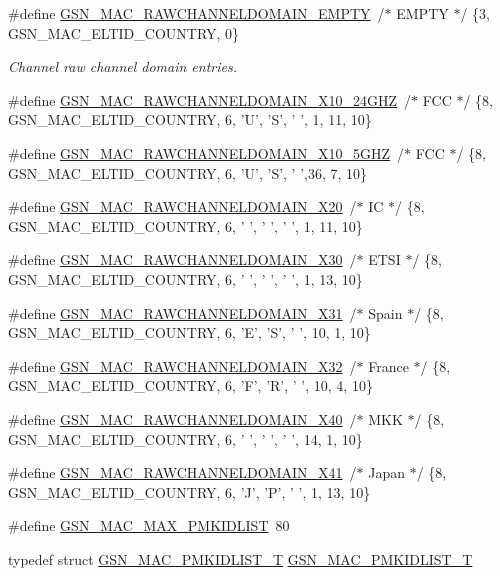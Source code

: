 \begin{DoxyCompactItemize}
\item 
\#define \hyperlink{a00642_ga56ae91b81107b9438ab55637317cab2c}{GSN\_\-MAC\_\-RAWCHANNELDOMAIN\_\-EMPTY}~/$\ast$ EMPTY  $\ast$/ \{3, GSN\_\-MAC\_\-ELTID\_\-COUNTRY, 0\}
\begin{DoxyCompactList}\small\item\em Channel raw channel domain entries. \end{DoxyCompactList}\item 
\#define \hyperlink{a00642_ga500c98f87ed8a4f3682e4b1b660bfe3d}{GSN\_\-MAC\_\-RAWCHANNELDOMAIN\_\-X10\_\-24GHZ}~/$\ast$ FCC    $\ast$/ \{8, GSN\_\-MAC\_\-ELTID\_\-COUNTRY, 6, 'U', 'S', ' ', 1, 11, 10\}
\item 
\#define \hyperlink{a00642_ga942c8bca51fccd885216a358eb762f55}{GSN\_\-MAC\_\-RAWCHANNELDOMAIN\_\-X10\_\-5GHZ}~/$\ast$ FCC    $\ast$/  \{8, GSN\_\-MAC\_\-ELTID\_\-COUNTRY, 6, 'U', 'S', ' ',36,  7, 10\}
\item 
\#define \hyperlink{a00642_gacbfcc1079a6c770488a643ba72c66f78}{GSN\_\-MAC\_\-RAWCHANNELDOMAIN\_\-X20}~/$\ast$ IC     $\ast$/ \{8, GSN\_\-MAC\_\-ELTID\_\-COUNTRY, 6, ' ', ' ', ' ', 1, 11, 10\}
\item 
\#define \hyperlink{a00642_gae86f5fe270e13731354c040379263373}{GSN\_\-MAC\_\-RAWCHANNELDOMAIN\_\-X30}~/$\ast$ ETSI   $\ast$/ \{8, GSN\_\-MAC\_\-ELTID\_\-COUNTRY, 6, ' ', ' ', ' ', 1, 13, 10\}
\item 
\#define \hyperlink{a00642_ga8f1d8d62d0476db2e67ae76fbbd8edcb}{GSN\_\-MAC\_\-RAWCHANNELDOMAIN\_\-X31}~/$\ast$ Spain  $\ast$/ \{8, GSN\_\-MAC\_\-ELTID\_\-COUNTRY, 6, 'E', 'S', ' ', 10, 1, 10\}
\item 
\#define \hyperlink{a00642_gae1d4ccda0a4874b368916cf6bffd8dd9}{GSN\_\-MAC\_\-RAWCHANNELDOMAIN\_\-X32}~/$\ast$ France $\ast$/ \{8, GSN\_\-MAC\_\-ELTID\_\-COUNTRY, 6, 'F', 'R', ' ', 10, 4, 10\}
\item 
\#define \hyperlink{a00642_ga438fdc847fa4e621ec8496edb440b33d}{GSN\_\-MAC\_\-RAWCHANNELDOMAIN\_\-X40}~/$\ast$ MKK    $\ast$/ \{8, GSN\_\-MAC\_\-ELTID\_\-COUNTRY, 6, ' ', ' ', ' ', 14, 1, 10\}
\item 
\#define \hyperlink{a00642_gad8ce3e93cc664b42d72189d4cbec214c}{GSN\_\-MAC\_\-RAWCHANNELDOMAIN\_\-X41}~/$\ast$ Japan  $\ast$/ \{8, GSN\_\-MAC\_\-ELTID\_\-COUNTRY, 6, 'J', 'P', ' ', 1, 13, 10\}
\item 
\#define \hyperlink{a00642_ga9f42c86bf65bb1ba654fb772cc494637}{GSN\_\-MAC\_\-MAX\_\-PMKIDLIST}~80
\item 
typedef struct \hyperlink{a00121}{GSN\_\-MAC\_\-PMKIDLIST\_\-T} \hyperlink{a00642_ga93df35fe1df8b6cf9f020c78019dd58c}{GSN\_\-MAC\_\-PMKIDLIST\_\-T}
\end{DoxyCompactItemize}


